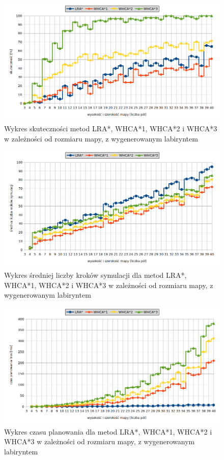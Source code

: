 \begin{figure}[H]
	\centering
	\includegraphics[width=0.9\columnwidth]{img/plots/test-steps-maze-mapsize-eff}
	\caption{Wykres skuteczności metod LRA*, WHCA*1, WHCA*2 i WHCA*3 w zależności od rozmiaru mapy, z wygenerowanym labiryntem}
	\label{fig:test-steps-maze-mapsize-eff}
\end{figure}
\begin{figure}[H]
	\centering
	\includegraphics[width=0.9\columnwidth]{img/plots/test-steps-maze-mapsize-steps}
	\caption{Wykres średniej liczby kroków symulacji dla metod LRA*, WHCA*1, WHCA*2 i WHCA*3 w zależności od rozmiaru mapy, z wygenerowanym labiryntem}
	\label{fig:test-steps-maze-mapsize-steps}
\end{figure}
\begin{figure}[H]
	\centering
	\includegraphics[width=0.9\columnwidth]{img/plots/test-steps-maze-mapsize-calctime}
	\caption{Wykres czasu planowania dla metod LRA*, WHCA*1, WHCA*2 i WHCA*3 w zależności od rozmiaru mapy, z wygenerowanym labiryntem}
	\label{fig:test-steps-maze-mapsize-calctime}
\end{figure}
